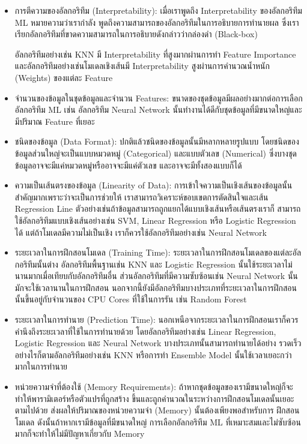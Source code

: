 \begin{itemize}[topsep=0pt]
    \item การตีความของอัลกอริทึม (Interpretability): เมื่อเราพูดถึง Interpretability ของอัลกอริทึม ML หมายความว่าเรากำลัง%
    พูดถึงความสามารถของอัลกอริทึมในการอธิบายการทำนายผล ซึ่งเราเรียกอัลกอริทึมที่ขาดความสามารถในการอธิบายดังกล่าวว่ากล่องดำ 
    (Black-box)

    อัลกอริทึมอย่างเช่น KNN มี Interpretability ที่สูงมากผ่านการทำ Feature Importance และอัลกอริทึมอย่างเช่นโมเดลเชิงเส้นมี 
    Interpretability สูงผ่านการคำนวณน้ำหนัก (Weights) ของแต่ละ Feature 
    
    \item จำนวนของข้อมูลในชุดข้อมูลและจำนวน Features: ขนาดของชุดข้อมูลมีผลอย่างมากต่อการเลือกอัลกอริทึม ML เช่น อัลกอริทึม 
    Neural Network นั้นทำงานได้ดีกับชุดข้อมูลที่มีขนาดใหญ่และมีปริมาณ Feature ที่เยอะ
    
    \item ชนิดของข้อมูล (Data Format): ปกติแล้วชนิดของข้อมูลนั้นมีหลากหลายรูปแบบ โดยชนิดของข้อมูลส่วนใหญ่จะเป็นแบบหมวดหมู่
    (Categorical) และแบบตัวเลข (Numerical) ซึ่งบางชุดข้อมูลอาจจะมีแค่หมวดหมู่หรืออาจจะมีแค่ตัวเลข และอาจจะมีทั้งสองแบบก็ได้
    
    \item ความเป็นเส้นตรงของข้อมูล (Linearity of Data): การเข้าใจความเป็นเชิงเส้นของข้อมูลนั้นสำคัญมากเพราะว่าจะเป็นการช่วยให้%
    เราสามารถวิเคราะห์ขอบเขตการตัดสินใจและเส้น Regression Line ตัวอย่างเช่นถ้าข้อมูลสามารถถูกแยกได้แบบเชิงเส้นหรือเส้นตรงเราก็%
    สามารถใช้อัลกอริทึมแบบเชิงเส้นอย่างเช่น SVM, Linear Regression หรือ Logistic Regression ได้ แต่ถ้าโมเดลมีความไม่เป็นเชิง%
    เราก็ควรใช้อัลกอริทึมอย่างเช่น Neural Network
    
    \item ระยะเวลาในการฝึกสอนโมเดล (Training Time): ระยะเวลาในการฝึกสอนโมเดลของแต่ละอัลกอริทึมนั้นต่าง อัลกอริทึมพื้นฐานเช่น 
    KNN และ Logistic Regression นั้นใช้ระยะเวลาไม่นานมากเมื่อเทียบกับอัลกอริทึมอื่น ส่วนอัลกอริทึมที่มีความซับซ้อนเช่น Neural
    Network นั้นมักจะใช้เวลานานในการฝึกสอน นอกจากนี้ยังมีอัลกอริทึมบางประเภทที่ระยะเวลาในการฝึกสอนนั้นขึ้นอยู่กับจำนวนของ CPU Cores 
    ที่ใช้ในการรัน เช่น Random Forest 
    
    \item ระยะเวลาในการทำนาย (Prediction Time): นอกเหนือจากระยะเวลาในการฝึกสอนเราก็ควรคำนึงถึงระยะเวลาที่ใช้ในการทำนายด้วย 
    โดยอัลกอริทึมอย่างเช่น Linear Regression, Logistic Regression และ Neural Network บางประเภทนั้นสามารถทำนายได้อย่าง%
    รวดเร็ว อย่างไรก็ตามอัลกอริทึมอย่างเช่น KNN หรือการทำ Ensemble Model นั้นใช้เวลาเยอะกว่ามากในการทำนาย
    
    \item หน่วยความจำที่ต้องใช้ (Memory Requirements): ถ้าหากชุดข้อมูลของเรามีขนาดใหญ่ก็จะทำให้พารามิเตอร์หรือตัวแปรที่ถูกสร้าง%
    ขึ้นและถูกคำนวณในระหว่างการฝึกสอนโมเดลนั้นเยอะตามไปด้วย ส่งผลให้ปริมาณของหน่วยความจำ (Memory) นั้นต้องเพียงพอสำหรับการ%
    ฝึกสอนโมเดล ดังนั้นถ้าหากเรามีข้อมูลที่มีขนาดใหญ่ การเลือกอัลกอริทึม ML ที่เหมาะสมและไม่ซับซ้อนมากก็จะทำให้ไม่มีปัญหาเกี่ยวกับ 
    Memory
\end{itemize}

